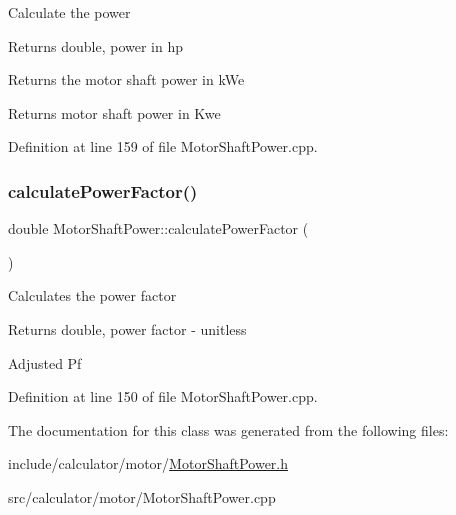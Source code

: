 Calculate the power

\begin{DoxyReturn}{Returns}
double, power in hp
\end{DoxyReturn}
Returns the motor shaft power in k\+We \begin{DoxyReturn}{Returns}
motor shaft power in Kwe 
\end{DoxyReturn}


Definition at line 159 of file Motor\+Shaft\+Power.\+cpp.

\mbox{\label{class_motor_shaft_power_aa7e9eb3a219c86f0ee0fb5b3d733b60a}} 
\subsubsection{\texorpdfstring{calculate\+Power\+Factor()}{calculatePowerFactor()}}
{\footnotesize\ttfamily double Motor\+Shaft\+Power\+::calculate\+Power\+Factor (\begin{DoxyParamCaption}{ }\end{DoxyParamCaption})}

Calculates the power factor

\begin{DoxyReturn}{Returns}
double, power factor -\/ unitless 
\end{DoxyReturn}
Adjusted Pf 

Definition at line 150 of file Motor\+Shaft\+Power.\+cpp.



The documentation for this class was generated from the following files\+:\begin{DoxyCompactItemize}
\item 
include/calculator/motor/\hyperlink{_motor_shaft_power_8h}{Motor\+Shaft\+Power.\+h}\item 
src/calculator/motor/Motor\+Shaft\+Power.\+cpp\end{DoxyCompactItemize}
